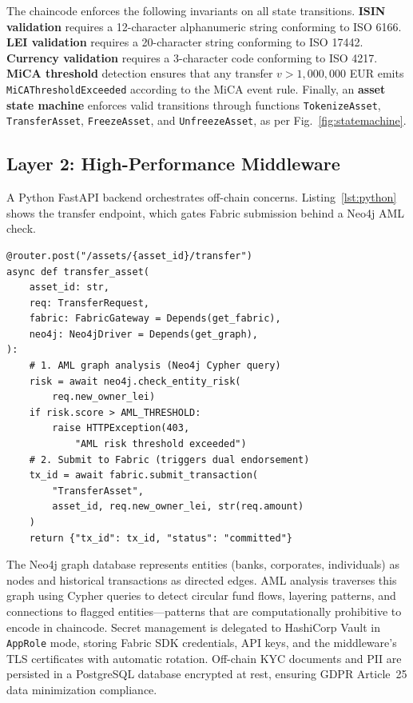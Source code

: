 \documentclass[journal,10pt,twocolumn]{IEEEtran}
\begin{document}
The chaincode enforces the following invariants on all state transitions. \textbf{ISIN validation} requires a 12-character alphanumeric string conforming to ISO 6166. \textbf{LEI validation} requires a 20-character string conforming to ISO 17442. \textbf{Currency validation} requires a 3-character code conforming to ISO 4217. \textbf{MiCA threshold} detection ensures that any transfer $v > 1{,}000{,}000$ EUR emits \texttt{MiCAThresholdExceeded} according to the MiCA event rule. Finally, an \textbf{asset state machine} enforces valid transitions through functions \texttt{TokenizeAsset}, \texttt{TransferAsset}, \texttt{FreezeAsset}, and \texttt{UnfreezeAsset}, as per Fig.~\ref{fig:statemachine}.

\subsection{Layer 2: High-Performance Middleware}

A Python FastAPI backend orchestrates off-chain concerns. Listing~\ref{lst:python} shows the transfer endpoint, which gates Fabric submission behind a Neo4j AML check.

\begin{lstlisting}[style=pythonstyle, caption={Python FastAPI middleware: AML pre-check before Fabric submission.}, label={lst:python}]
@router.post("/assets/{asset_id}/transfer")
async def transfer_asset(
    asset_id: str,
    req: TransferRequest,
    fabric: FabricGateway = Depends(get_fabric),
    neo4j: Neo4jDriver = Depends(get_graph),
):
    # 1. AML graph analysis (Neo4j Cypher query)
    risk = await neo4j.check_entity_risk(
        req.new_owner_lei)
    if risk.score > AML_THRESHOLD:
        raise HTTPException(403,
            "AML risk threshold exceeded")
    # 2. Submit to Fabric (triggers dual endorsement)
    tx_id = await fabric.submit_transaction(
        "TransferAsset",
        asset_id, req.new_owner_lei, str(req.amount)
    )
    return {"tx_id": tx_id, "status": "committed"}
\end{lstlisting}

The Neo4j graph database represents entities (banks, corporates, individuals) as nodes and historical transactions as directed edges. AML analysis traverses this graph using Cypher queries to detect circular fund flows, layering patterns, and connections to flagged entities---patterns that are computationally prohibitive to encode in chaincode. Secret management is delegated to HashiCorp Vault in \texttt{AppRole} mode, storing Fabric SDK credentials, API keys, and the middleware's TLS certificates with automatic rotation. Off-chain KYC documents and PII are persisted in a PostgreSQL database encrypted at rest, ensuring GDPR Article~25 data minimization compliance.
\end{document}
